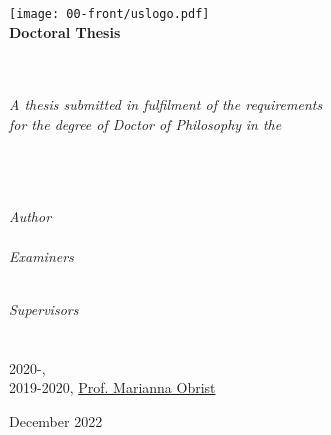 \thispagestyle{empty}
{}
\begin{center}
	\texttt{[image: 00-front/uslogo.pdf]}\\[1cm]%

	\textbf{\Large Doctoral Thesis}

	\Huge \textbf{\myTitle}\\[0.5cm] %
	\large \textbf{\mySubtitle}\\[2cm]
	\large \textit{A thesis submitted in fulfilment of the requirements\\ for the degree of Doctor of Philosophy} %
	\textit{in the}\\[1.2cm]
	\myDepartment\\ \myFaculty\\ \myUni\\[0.4cm]
	\vspace*{0.25cm}
	\begin{minipage}[t]{.39\linewidth}
		\begin{flushleft} %
		\emph{Author}\\
		\href{\myNameLink}{\myName}\\
		\emph{Examiners}\\
		\href{https://profiles.sussex.ac.uk/p145629-mary-agnes-krell/}{\myFirstExaminer} 		\\
		\href{https://frederic-bevilacqua.net/bio/bio-in-english/}{\mySecondExaminer}
		\end{flushleft}
	\end{minipage}
	\begin{minipage}[t]{.59\linewidth}
		\begin{flushright} %
		\emph{Supervisors}\\
		\href{https://profiles.sussex.ac.uk/p208667-chris-kiefer/}{\myFirstSupervisor} 			\\
		\href{https://profiles.sussex.ac.uk/p235751-cecile-chevalier/}{\mySecondSupervisor} 	\\
		2020-, \href{https://profiles.sussex.ac.uk/p92444-jamie-ward}{\myThirdSupervisor} 	\\
		2019-2020, \href{https://uclic.ucl.ac.uk/people/marianna-obrist}{Prof. Marianna Obrist} 
		\end{flushright}
	\end{minipage}
	\vfill
	\large December 2022
\end{center}